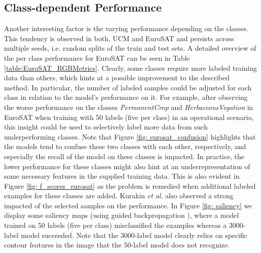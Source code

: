 \documentclass[journal]{IEEEtran}
\newcommand{\etal}{\textit{et al.}}
\begin{document}
\subsection{Class-dependent Performance}
Another interesting factor is the varying performance depending on the classes. This tendency is observed in both, UCM and EuroSAT and persists across multiple seeds, i.e. random splits of the train and test sets. A detailed overview of the per class performance for EuroSAT can be seen in Table \ref{table:EuroSAT_RGBMetrics}. Clearly, some classes require more labeled training data than others, which hints at a possible improvement to the described method. In particular, the number of labeled samples could be adjusted for each class in relation to the model's performance on it. For example, after observing the worse performance on the classes \textit{PermanentCrop} and \textit{HerbaceousVegation} in EuroSAT when training with 50 labels (five per class) in an operational scenario, this insight could be used to selectively label more data from such underperforming classes. Note that Figure \ref{fig: eurosat_confusion} highlights that the models tend to confuse these two classes with each other, respectively, and especially the recall of the model on these classes is impacted. In practice, the lower performance for these classes might also hint at an underrepresentation of some necessary features in the supplied training data. This is also evident in Figure \ref{fig: f_scores_eurosat} as the problem is remedied when additional labeled examples for these classes are added. Kurakin \etal{} \cite{kurakin2020} also observed a strong impacted of the selected samples on the performance. In Figure \ref{fig: saliency} we display some saliency maps (using guided backpropagation \cite{uozbulak2019,springenberg2014}), where a model trained on 50 labels (five per class) misclassified the examples whereas a 3000-label model succeeded. Note that the 3000-label model clearly relies on specific contour features in the image that the 50-label model does not recognize. \par
\end{document}
